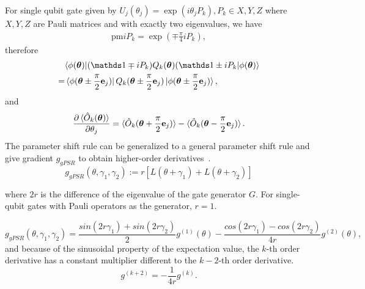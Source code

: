 For single qubit gate given by $U_j(\theta_j) = \operatorname{exp}(i\theta_jP_k), P_k \in {X,Y,Z}$ where ${X,Y,Z}$ are Pauli matrices and with exactly two eigenvalues, we have~\cite{schuld_evaluating_2019}
\begin{align}\label{eq:optimization:shift_rule_principal}
    \unit \pm i P_{k} = \operatorname{exp}(\mp\frac{\pi}{4} i P_k),
\end{align}
therefore
\begin{align}
    &\langle \phi(\boldsymbol{\theta})| (\unit \mp i P_{k})Q_k(\boldsymbol{\theta})(\unit \pm i P_{k} |\phi(\boldsymbol{\theta})\rangle \\=& \bra{\phi(\boldsymbol{\theta} \pm \frac{\pi}{2}\mathbf{e}_j)}    Q_k(\boldsymbol{\theta} \pm \frac{\pi}{2}\mathbf{e}_j)  \ket{\phi(\boldsymbol{\theta} \pm \frac{\pi}{2}\mathbf{e}_j)},
\end{align}
and 
\begin{align}
    \frac{\partial \braket{\hat{O}_k(\boldsymbol{\theta})}}{\partial \theta_j} = \braket{\hat{O}_k(\boldsymbol{\theta}+\frac{\pi}{2}\mathbf{e}_j)} - \braket{\hat{O}_k(\boldsymbol{\theta}-\frac{\pi}{2}\mathbf{e}_j)}.
\end{align}
The parameter shift rule can be generalized to a general parameter shift rule and give gradient $g_{gPSR}$ to obtain higher-order derivatives~\cite{schuld_evaluating_2019,Hubregtsen2022}.
\begin{equation}
    g_{gPSR}(\theta,\gamma_1,\gamma_2) := r[L(\theta + \gamma_1) + L(\theta + \gamma_2)]
\end{equation}

where $2r$ is the difference of the eigenvalue of the gate generator $G$. For single-qubit gates with Pauli operators as the generator, $r=1$. 

\begin{equation}
    g_{gPSR}(\theta,\gamma_1,\gamma_2) = \frac{sin(2r\gamma_1)+sin(2r\gamma_2)}{2}g^{(1)}(\theta) - \frac{cos(2r\gamma_1)-cos(2r\gamma_2)}{4r}g^{(2)}(\theta),
\end{equation}
and because of the sinusoidal property of the expectation value, the $k$-th order derivative has a constant multiplier different to the $k-2$-th order derivative.
\begin{equation}
 g^{(k+2)} = -\frac{1}{4r} g^{(k)}.
\end{equation}

